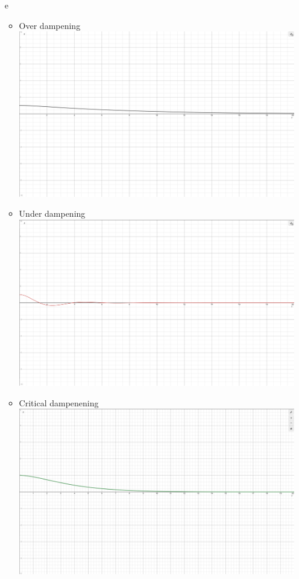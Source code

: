 \documentclass[12pt, letterpaper]{article}
\begin{document}
\begin{enumerate}
\begin{enumerate}
		\item[e] 
		\begin{itemize}
			\item Over dampening\\
			\includegraphics[scale=0.3]{overdamped292hw6}
			\item Under dampening\\
			\includegraphics[scale=0.3]{underdamped292hw6}		
			\item Critical dampenening\\
			\includegraphics[scale=0.3]{criticallydampened292hw6.png}

\end{itemize}
\end{enumerate}
\end{enumerate}
\end{document}
